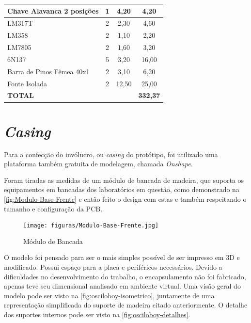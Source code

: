 \begin{table}[h!]
\begin{tabular}{|l|c|c|c|}
Chave Alavanca 2 posições & 1 & 4,20 & 4,20 \\ \hline
LM317T & 2 & 2,30 & 4,60 \\ \hline
LM358 & 2 & 1,10 & 2,20 \\ \hline
LM7805 & 2 & 1,60 & 3,20 \\ \hline
6N137 & 5 & 3,20 & 16,00 \\ \hline
Barra de Pinos Fêmea 40x1 & 2 & 3,10 & 6,20 \\ \hline
Fonte Isolada & 2 & 12,50 & 25,00 \\ \hline
\textbf{TOTAL} &  &  & \textbf{332,37} \\ \hline
\end{tabular}
\end{table}


\section{\textit{Casing}}\label{Casing}

Para a confecção do invólucro, ou \textit{casing} do protótipo, foi utilizado uma plataforma também gratuita de modelagem, chamada \textit{Onshape}.

Foram tiradas as medidas de um módulo de bancada de madeira, que suporta os equipamentos em bancadas dos laboratórios em questão, como demonstrado na \autoref{fig:Modulo-Base-Frente} e então feito o design com estas e também respeitando o tamanho e configuração da \gls{PCB}.

\begin{figure}[htb!]
    \caption{Módulo de Bancada}
    \label{fig:Modulo-Base-Frente}
    \texttt{[image: figuras/Modulo-Base-Frente.jpg]}
    \fonte{}
\end{figure}

O modelo foi pensado para ser o mais simples possível de ser impresso em 3D e modificado. Possui espaço para a placa e periféricos necessários.
Devido a dificuldades no desenvolvimento do trabalho, o encapsulamento não foi fabricado, apenas teve seu dimensional analisado em ambiente virtual.
Uma visão geral do modelo pode ser visto na \autoref{fig:osciloboy-isometrico}, juntamente de uma representação simplificada do suporte de madeira citado anteriormente.
O detalhe dos suportes internos pode ser visto na \autoref{fig:osciloboy-detalhes}.

